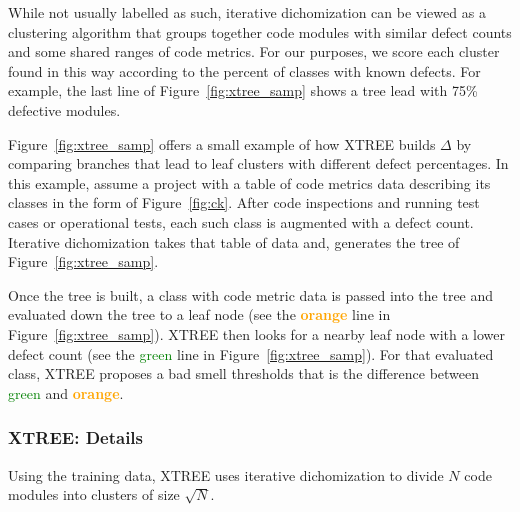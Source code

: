 \documentclass[twocolumn,5p]{elsarticle}
\newcommand{\fig}[1]{Figure~\ref{fig:#1}}
\theoremstyle{break}
\begin{document}
 
  While not usually labelled as such, iterative dichomization can
  be viewed as a clustering algorithm that groups together code modules
  with similar defect counts and some shared ranges of code metrics.
  For our purposes, we score each cluster found in this way according
  to the percent of classes with known defects. For example,
  the last line of \fig{xtree_samp} shows a tree lead with 75\%
  defective modules.
  
 \fig{xtree_samp} offers
  a small example of how XTREE builds
    $\Delta$ by comparing branches that lead to leaf clusters
  with different defect percentages. In this example, assume a project with a table of code metrics data describing its classes in the form of \fig{ck}. After code inspections and running test cases or operational
      tests, each such class is augmented with a defect count.
      Iterative dichomization takes that table of data and, 
        generates the tree of \fig{xtree_samp}.
        
     Once the tree is built, a class with code metric data is passed into the tree and evaluated down the tree to a leaf node (see the \textcolor{orange}{{\bf orange}} line in \fig{xtree_samp}).
      XTREE then looks for a nearby leaf node with a lower defect
      count (see the \textcolor{green}{{green}} line in \fig{xtree_samp}). For that evaluated class, XTREE proposes a bad smell
      thresholds that is  the difference between 
      \textcolor{green}{{green}} and \textcolor{orange}{{\bf orange}}. 
  
  
\subsubsection{XTREE:   Details}

Using the training data,  XTREE uses  
iterative dichomization to
  divide  $N$ code modules  into  clusters of
size $\sqrt{N}$.
\end{document}
